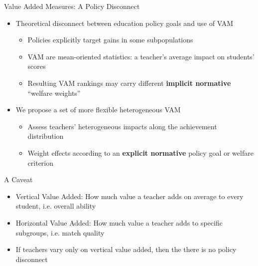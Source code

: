 \documentclass[11pt]{beamer}
\begin{document}

\begin{frame}{Value Added Measures: A Policy Disconnect}

\begin{itemize}
    \item Theoretical disconnect between education policy goals and use of VAM 
    \begin{itemize}
        \item Policies explicitly target gains in some subpopulations
        \item VAM are mean-oriented statistics: a teacher's average impact on students' scores
        \item Resulting VAM rankings may carry different \textbf{implicit normative} ``welfare weights''
    \end{itemize}
    
    \item  We propose a set of more flexible heterogeneous VAM 
    \begin{itemize}
        \item Assess teachers' heterogeneous impacts along the achievement distribution
        \item  Weight effects according to an \textbf{explicit normative} policy goal or welfare criterion
    \end{itemize}
\end{itemize}

\end{frame}



\begin{frame}{A Caveat}

\begin{itemize}
    \item Vertical Value Added: How much value a teacher adds on average to every student, i.e. overall ability
    \item Horizontal Value Added: How much value a teacher adds to specific subgroups, i.e. match quality
    \item If teachers vary only on vertical value added, then the there is no policy disconnect
\end{itemize}

\end{frame}
\end{document}
